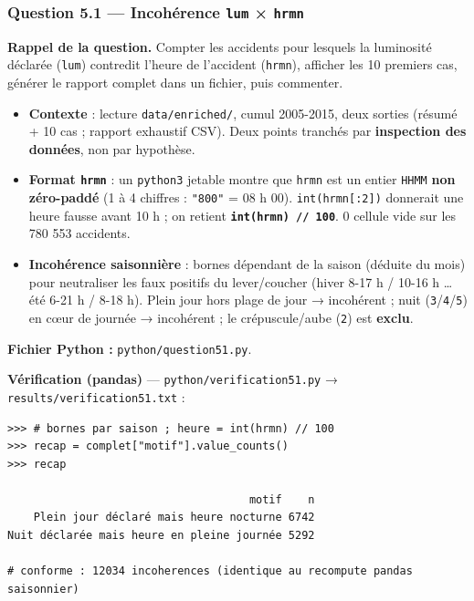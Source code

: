 \documentclass[11pt,a4paper]{article}
\newcommand{\rub}[2]{\textbf{\textcolor{#1}{#2}}}
\begin{document}
\clearpage
\subsubsection*{Question 5.1 — Incohérence \texttt{lum} × \texttt{hrmn}}

\rub{labrappel}{Rappel de la question.} Compter les accidents pour lesquels la luminosité déclarée (\texttt{lum}) contredit l'heure de l'accident (\texttt{hrmn}), afficher les 10 premiers cas, générer le rapport complet dans un fichier, puis commenter.

\begin{agentbox}
\begin{itemize}
\item \textbf{Contexte} : lecture \texttt{data/enriched/}, cumul 2005-2015, deux sorties (résumé + 10 cas ; rapport exhaustif CSV). Deux points tranchés par \textbf{inspection des données}, non par hypothèse.
\item \textbf{Format \texttt{hrmn}} : un \texttt{python3} jetable montre que \texttt{hrmn} est un entier \texttt{HHMM} \textbf{non zéro-paddé} (1 à 4 chiffres : \texttt{"800"} = 08 h 00). \texttt{int(hrmn[:2])} donnerait une heure fausse avant 10 h ; on retient \textbf{\texttt{int(hrmn) // 100}}. 0 cellule vide sur les 780 553 accidents.
\item \textbf{Incohérence saisonnière} : bornes dépendant de la saison (déduite du mois) pour neutraliser les faux positifs du lever/coucher (hiver 8-17 h / 10-16 h … été 6-21 h / 8-18 h). Plein jour hors plage de jour → incohérent ; nuit (\texttt{3}/\texttt{4}/\texttt{5}) en cœur de journée → incohérent ; le crépuscule/aube (\texttt{2}) est \textbf{exclu}.
\end{itemize}
\end{agentbox}

\rub{labfichier}{Fichier Python :} \texttt{python/question51.py}.

\rub{labverif}{Vérification (pandas)} --- \texttt{python/verification51.py} → \texttt{results/verification51.txt} :

\begin{lstlisting}[style=pyblock]
>>> # bornes par saison ; heure = int(hrmn) // 100
>>> recap = complet["motif"].value_counts()
>>> recap

                                     motif    n
    Plein jour déclaré mais heure nocturne 6742
Nuit déclarée mais heure en pleine journée 5292

# conforme : 12034 incoherences (identique au recompute pandas saisonnier)
\end{lstlisting}
\end{document}
